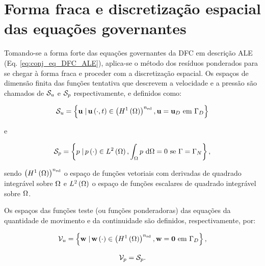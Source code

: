 \documentclass[tese_patricia]{subfiles}%
\begin{document}
\section{Forma fraca e discretização espacial das equações governantes} \label{capitulo:Cap2:FormaFraca}

Tomando-se a forma forte das equações governantes da DFC em descrição ALE (Eq. \eqref{eq:conj_eq_DFC_ALE}), aplica-se o método dos resíduos ponderados para se chegar à forma fraca e proceder com a discretização espacial. Os espaços de dimensão finita das funções tentativa que descrevem a velocidade e a pressão são chamados de $\mathcal{S}_u$ e $\mathcal{S}_p$ respectivamente, e definidos como:

\begin{align}
\mathcal{S}_u = \left\{\mathbf{u} \left . \right| \mathbf{u} \left(\cdot,t\right) \in \left(H^{1}\left(\Omega\right)\right)^{{n_{\mathrm{sd}}}}, \mathbf{u} = \mathbf{u}_D \ \textrm {em} \ \Gamma_{D} \right\}
\end{align}

\noindent e

\begin{align}
\mathcal{S}_p = \left\{p \left . \right| p \left(\cdot\right) \in L^{2}\left(\Omega\right), \int_{\Omega}p \textrm { } \mathrm{d} \Omega = 0 \textrm { se } \Gamma = \Gamma_{N} \right\},
\end{align}

\noindent sendo $\left(H^{1}\left(\Omega\right)\right)^{{n_{\mathrm{sd}}}}$ o espaço de funções vetoriais com derivadas de quadrado integrável sobre $\Omega$ e $L^{2}\left(\Omega\right)$ o espaço de funções escalares de quadrado integrável sobre $\Omega$.

Os espaços das funções teste (ou funções ponderadoras) das equações da quantidade de movimento e da continuidade são definidos, respectivamente, por:

\begin{align}
\mathcal{V}_u = \left\{\mathbf{w} \left . \right| \mathbf{w} \left(\cdot\right) \in \left(H^{1}\left(\Omega\right)\right)^{{n_{\mathrm{sd}}}}, \mathbf{w} = \mathbf{0} \textrm { em} \ \Gamma_{D} \right\},
\end{align}


\begin{align}
\mathcal{V}_p = \mathcal{S}_p.
\end{align}
\end{document}
